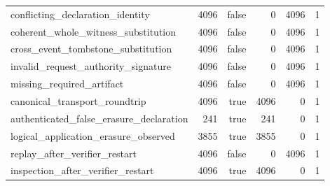 \begin{table}[t]
\begin{tabular}{lrrrrr}
conflicting\_declaration\_identity & 4096 & false & 0 & 4096 & 1 \\
coherent\_whole\_witness\_substitution & 4096 & false & 0 & 4096 & 1 \\
cross\_event\_tombstone\_substitution & 4096 & false & 0 & 4096 & 1 \\
invalid\_request\_authority\_signature & 4096 & false & 0 & 4096 & 1 \\
missing\_required\_artifact & 4096 & false & 0 & 4096 & 1 \\
canonical\_transport\_roundtrip & 4096 & true & 4096 & 0 & 1 \\
authenticated\_false\_erasure\_declaration & 241 & true & 241 & 0 & 1 \\
logical\_application\_erasure\_observed & 3855 & true & 3855 & 0 & 1 \\
replay\_after\_verifier\_restart & 4096 & false & 0 & 4096 & 1 \\
inspection\_after\_verifier\_restart & 4096 & true & 4096 & 0 & 1 \\
\bottomrule
\end{tabular}
\end{table}
